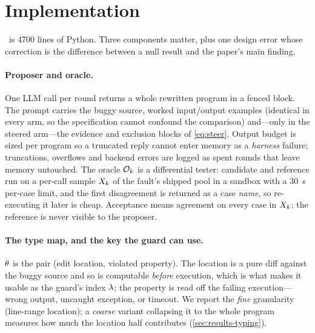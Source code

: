 \section{Implementation}
\label{sec:impl}

\CEGMem\ is \num{4700} lines of Python. Three components matter, plus one
design error whose correction is the difference between a null result and the
paper's main finding.

\paragraph{Proposer and oracle.}
One LLM call per round returns a whole rewritten program in a fenced block. The
prompt carries the buggy source, worked input/output examples (identical in
every arm, so the specification cannot confound the comparison) and---only in
the steered arm---the evidence and exclusion blocks of \cref{eq:steer}. Output
budget is sized per program so a truncated reply cannot enter memory as a
\emph{harness} failure; truncations, overflows and backend errors are logged as
spent rounds that leave memory untouched. The oracle $\mathcal{O}_{k}$ is a differential
tester: candidate and reference run on a per-call sample $X_{k}$ of the fault's
shipped pool in a sandbox with a \SI{30}{\second} per-case limit, and the first
disagreement is returned as a case \emph{name}, so re-executing it later is
cheap. Acceptance means agreement on every case in $X_{k}$; the reference is
never visible to the proposer.

\paragraph{The type map, and the key the guard can use.}
$\theta$ is the pair (edit location, violated property). The location is a pure
diff against the buggy source and so is computable \emph{before} execution,
which is what makes it usable as the guard's index $\lambda$; the property is read
off the failing execution---wrong output, uncaught exception, or timeout. We
report the \emph{fine} granularity (line-range location); a \emph{coarse}
variant collapsing it to the whole program measures how much the location half
contributes (\cref{sec:results-typing}).

